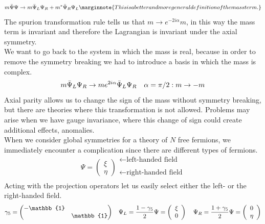 \documentclass[../main.tex]{subfiles}
\begin{document}
\[
m\Bar{\Psi}\Psi\to m\Bar{\Psi}_L\Psi_R+m^*\Bar{\Psi}_R\Psi_L\marginnote{This is a better and more general definition of the mass term.}
\]
The spurion transformation rule tells us that $m\to e^{-2i\alpha}m$, in this way the mass term is invariant and therefore the Lagrangian is invariant under the axial symmetry.\\
We want to go back to the system in which the mass is real, because in order to remove the symmetry breaking we had to introduce a basis in which the mass is complex.
\[
m\Bar{\Psi}_L\Psi_R\to me^{2i\alpha}\Bar{\Psi}_L\Psi_R \quad \alpha=\pi/2: m\to-m
\]
Axial parity allows us to change the sign of the mass without symmetry breaking, but there are theories where this transformation is not allowed. Problems may arise when we have gauge invariance, where this change of sign could create additional effects, anomalies.\\
When we consider global symmetries for a theory of $N$ free fermions, we immediately encounter a complication since there are different types of fermions.
\[
\Psi=\left(\begin{array}{c}
     \xi \\
     \eta
\end{array}\right)
\begin{array}{c}
     \xleftarrow[]{}\text{left-handed field}\\
     \xleftarrow[]{}\text{right-handed field}
\end{array}
\]
Acting with the projection operators let us easily select either the left- or the right-handed field.
\[
\gamma_5=\mqty(\dmat{-\mathbb{1},\mathbb{1}})
\quad
\Psi_L=\frac{1-\gamma_5}{2}\Psi=
\left(\begin{array}{c}
    \xi \\
     0
\end{array}\right)
\quad
\Psi_R=\frac{1+\gamma_5}{2}\Psi=
\left(\begin{array}{c}
     0 \\
     \eta
\end{array}\right)
\]
\end{document}
